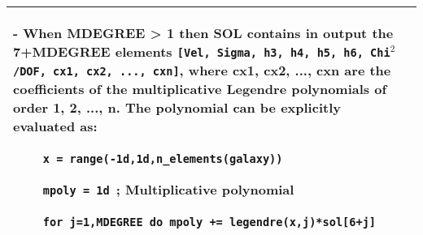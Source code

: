 \begin{center}
\begin{longtable}{p{2.7cm}| p{11.1cm}}
    \smallskip

     - When MDEGREE > 1 then SOL contains in output the 7+MDEGREE
     elements {\tt [Vel, Sigma, h3, h4, h5, h6, Chi$^2$/DOF, cx1, cx2,
         ..., cxn]}, where cx1, cx2, ..., cxn are the coefficients of
     the multiplicative Legendre polynomials of order 1, 2, ...,
     n. The polynomial can be explicitly evaluated as:
       
       \medskip
   
          \ \ \  \ {\tt x = range(-1d,1d,n\_elements(galaxy))}
      
          \ \ \  \ {\tt mpoly = 1d }; Multiplicative polynomial
      
          \ \ \  \ {\tt for j=1,MDEGREE do mpoly += legendre(x,j)*sol[6+j]}\\
\hline
\hline
\end{longtable}
\end{center}
